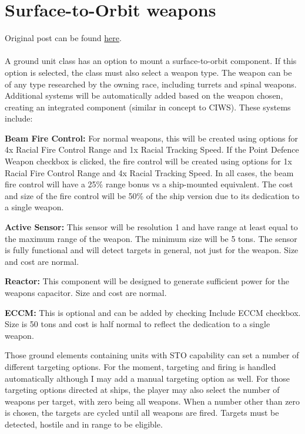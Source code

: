\documentclass[../../Aurora C# unofficial manual.tex]{subfiles}
\begin{document}
	\section{Surface-to-Orbit weapons}
	Original post can be found
	\href{http://aurora2.pentarch.org/index.php?topic=8495.msg110500#msg110500}{here}.
	\\\\
	
	A ground unit class has an option to mount a surface-to-orbit component. If this option is selected, the class must also select a weapon type. The weapon can be of any type researched by the owning race, including turrets and spinal weapons. Additional systems will be automatically added based on the weapon chosen, creating an integrated component (similar in concept to CIWS). These systems include:
	
	\textbf{Beam Fire Control:} For normal weapons, this will be created using options for 4x Racial Fire Control Range and 1x Racial Tracking Speed. If the Point Defence Weapon checkbox is clicked, the fire control will be created using options for 1x Racial Fire Control Range and 4x Racial Tracking Speed. In all cases, the beam fire control will have a 25\% range bonus vs a ship-mounted equivalent. The cost and size of the fire control will be 50\% of the ship version due to its dedication to a single weapon.
	
	\textbf{Active Sensor:} This sensor will be resolution 1 and have range at least equal to the maximum range of the weapon. The minimum size will be 5 tons. The sensor is fully functional and will detect targets in general, not just for the weapon. Size and cost are normal.
	
	\textbf{Reactor:} This component will be designed to generate sufficient power for the weapons capacitor. Size and cost are normal.
	
	\textbf{ECCM:} This is optional and can be added by checking Include ECCM checkbox. Size is 50 tons and cost is half normal to reflect the dedication to a single weapon.
	
	Those ground elements containing units with STO capability can set a number of different targeting options. For the moment, targeting and firing is handled automatically although I may add a manual targeting option as well. For those targeting options directed at ships, the player may also select the number of weapons per target, with zero being all weapons. When a number other than zero is chosen, the targets are cycled until all weapons are fired. Targets must be detected, hostile and in range to be eligible.
	
\end{document}
